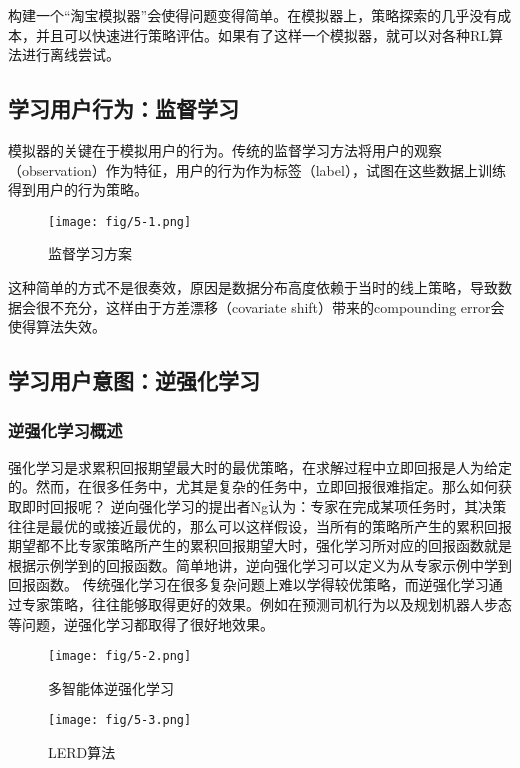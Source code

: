 构建一个“淘宝模拟器”会使得问题变得简单。在模拟器上，策略探索的几乎没有成本，并且可以快速进行策略评估。如果有了这样一个模拟器，就可以对各种RL算法进行离线尝试。

\subsection{学习用户行为：监督学习}
模拟器的关键在于模拟用户的行为。传统的监督学习方法将用户的观察（observation）作为特征，用户的行为作为标签（label），试图在这些数据上训练得到用户的行为策略。

\begin{figure}[!h]
\centering
\texttt{[image: fig/5-1.png]}
\caption{监督学习方案}
\end{figure}


这种简单的方式不是很奏效，原因是数据分布高度依赖于当时的线上策略，导致数据会很不充分，这样由于方差漂移（covariate shift）带来的compounding error会使得算法失效。

\subsection{学习用户意图：逆强化学习}
\subsubsection{逆强化学习概述}
强化学习是求累积回报期望最大时的最优策略，在求解过程中立即回报是人为给定的。然而，在很多任务中，尤其是复杂的任务中，立即回报很难指定。那么如何获取即时回报呢？
逆向强化学习的提出者Ng认为：专家在完成某项任务时，其决策往往是最优的或接近最优的，那么可以这样假设，当所有的策略所产生的累积回报期望都不比专家策略所产生的累积回报期望大时，强化学习所对应的回报函数就是根据示例学到的回报函数。简单地讲，逆向强化学习可以定义为从专家示例中学到回报函数。
传统强化学习在很多复杂问题上难以学得较优策略，而逆强化学习通过专家策略，往往能够取得更好的效果。例如在预测司机行为以及规划机器人步态等问题，逆强化学习都取得了很好地效果。

\begin{figure}[!t]
\centering
\texttt{[image: fig/5-2.png]}
\caption{多智能体逆强化学习}
\end{figure}

\begin{figure}[!t]
\centering
\texttt{[image: fig/5-3.png]}
\caption{LERD算法}
\end{figure}

